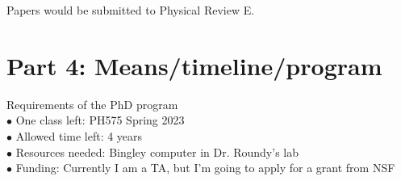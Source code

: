 \documentclass[double,12pt]{revtex4-2}
\begin{document}
\noindent Papers would be submitted to Physical Review E.

\section{Part 4: Means/timeline/program}
\noindent Requirements of the PhD program \\
$\bullet$ One class left: PH575 Spring 2023 \\
$\bullet$ Allowed time left: 4 years \\
$\bullet$ Resources needed: Bingley computer in Dr. Roundy's lab \\
$\bullet$ Funding: Currently I am a TA, but I'm going to apply for a grant from NSF \\
\end{document}
